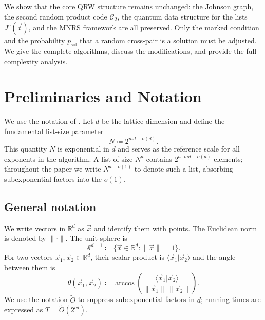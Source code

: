 \documentclass[10pt,a4paper]{article}
\begin{document}
We show that the core QRW structure remains unchanged: the Johnson graph, the second random product code \(\mathcal{C}_2\), the quantum data structure for the lists \(J^v(\vec{t})\), and the MNRS framework are all preserved. Only the marked condition and the probability \(p_{\mathrm{sol}}\) that a random cross-pair is a solution must be adjusted. We give the complete algorithms, discuss the modifications, and provide the full complexity analysis.

\section{Preliminaries and Notation}
\label{sec:prelim}

We use the notation of \cite{CL21,CL23}. Let \(d\) be the lattice dimension and define the fundamental list-size parameter
\begin{equation}
N \coloneqq 2^{md+o(d)}.
\end{equation}
This quantity \(N\) is exponential in \(d\) and serves as the reference scale for all exponents in the algorithm. A list of size \(N^{a}\) contains \(2^{a\cdot md + o(d)}\) elements; throughout the paper we write \(N^{a+o(1)}\) to denote such a list, absorbing subexponential factors into the \(o(1)\).

\subsection{General notation}
\label{sec:notation}

We write vectors in \(\mathbb{R}^{d}\) as \(\vec{x}\) and identify them with points. The Euclidean norm is denoted by \(\|\cdot\|\). The unit sphere is
\begin{equation}
\mathcal{S}^{d-1} \coloneqq \{\vec{x}\in\mathbb{R}^{d} : \|\vec{x}\|=1\}.
\end{equation}
For two vectors \(\vec{x}_1,\vec{x}_2\in\mathbb{R}^{d}\), their scalar product is \(\langle \vec{x}_1|\vec{x}_2\rangle\) and the angle between them is
\begin{equation}
\theta(\vec{x}_1,\vec{x}_2) \coloneqq \arccos\!\left(\frac{\langle \vec{x}_1|\vec{x}_2\rangle}{\|\vec{x}_1\|\,\|\vec{x}_2\|}\right).
\end{equation}
We use the notation \(\tilde{O}\) to suppress subexponential factors in \(d\); running times are expressed as \(T=\tilde{O}(2^{cd})\).
\end{document}
